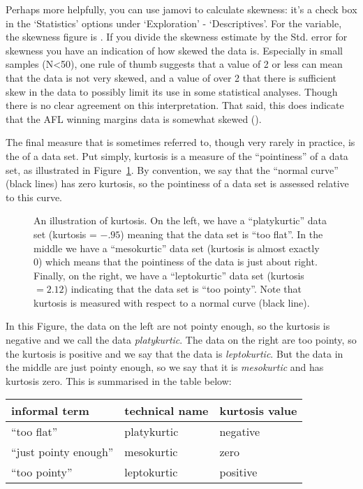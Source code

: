 Perhaps more helpfully, you can use jamovi to calculate skewness: it's a check box in the `Statistics' options under `Exploration' - `Descriptives'. For the  variable, the skewness figure is . If you divide the skewness estimate by the Std. error for skewness you have an indication of how skewed the data is. Especially in small samples (N<50), one rule of thumb suggests that a value of 2 or less can mean that the data is not very skewed, and a value of over 2 that there is sufficient skew in the data to possibly limit its use in some statistical analyses. Though there is no clear agreement on this interpretation. That said, this does indicate that the AFL winning margins data is somewhat skewed (). 

The final measure that is sometimes referred to, though very rarely in practice, is the  of a data set. Put simply, kurtosis is a measure of the ``pointiness'' of a data set, as illustrated in Figure~\ref{fig:kurtosis}. By convention, we say that the ``normal curve'' (black lines) has zero kurtosis, so the pointiness of a data set is assessed relative to this curve. 

\begin{figure}[htb]
\begin{center}
\caption{An illustration of kurtosis. On the left, we have a ``platykurtic'' data set (kurtosis = $-.95$) meaning that the data set is ``too flat''. In the middle we have a ``mesokurtic'' data set (kurtosis is almost exactly 0) which means that the pointiness of the data is just about right. Finally, on the right, we have a ``leptokurtic'' data set (kurtosis $= 2.12$) indicating that the data set is ``too pointy''. Note that kurtosis is measured with respect to a normal curve (black line).}
\label{fig:kurtosis}
\HR
\end{center}
\end{figure}

In this Figure, the data on the left are not pointy enough, so the kurtosis is negative and we call the data {\it platykurtic}. The data on the right are too pointy, so the kurtosis is positive and we say that the data is {\it leptokurtic}. But the data in the middle are just pointy enough, so we say that it is {\it mesokurtic} and has kurtosis zero. This is summarised in the table below:

\begin{center}
\begin{tabular}{lll}
informal term & technical name & kurtosis value \\ \hline
``too flat'' & platykurtic & negative \\
``just pointy enough'' & mesokurtic & zero \\
``too pointy'' & leptokurtic & positive 
\end{tabular}
\end{center}

